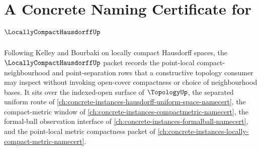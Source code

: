 \chapter{A Concrete Naming Certificate for $\LocallyCompactHausdorffUp$}
\label{ch:concrete-instances-locally-compact-hausdorff-namecert}

Following Kelley and Bourbaki on locally compact Hausdorff spaces, the $\LocallyCompactHausdorffUp$ packet records the point-local compact-neighbourhood and point-separation rows that a constructive topology consumer may inspect without invoking open-cover compactness or choice of neighbourhood bases. It sits over the indexed-open surface of $\TopologyUp$, the separated uniform route of \autoref{ch:concrete-instances-hausdorff-uniform-space-namecert}, the compact-metric window of \autoref{ch:concrete-instances-compactmetric-namecert}, the formal-ball observation interface of \autoref{ch:concrete-instances-formalball-namecert}, and the point-local metric compactness packet of \autoref{ch:concrete-instances-locally-compact-metric-namecert}.

